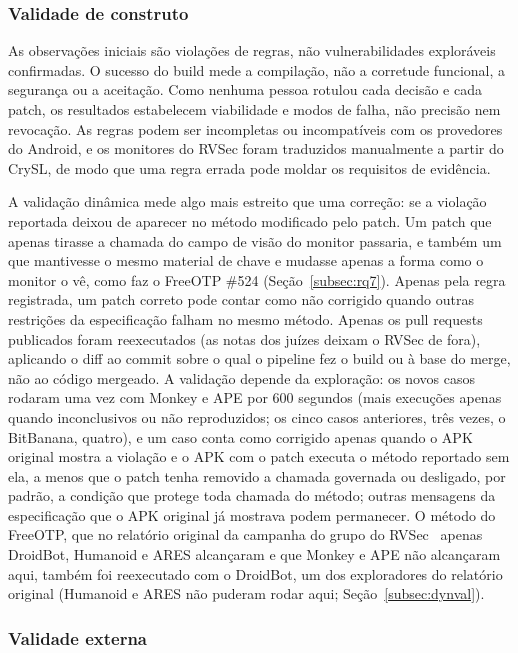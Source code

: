 \documentclass[conference]{IEEEtran}
\begin{document}
\subsubsection{Validade de construto}

As observações iniciais são violações de regras, não vulnerabilidades exploráveis
confirmadas. O sucesso do build mede a compilação, não a corretude funcional,
a segurança ou a aceitação. Como nenhuma pessoa rotulou cada decisão
e cada patch, os resultados estabelecem viabilidade e modos de falha, não precisão
nem revocação. As regras podem ser incompletas ou incompatíveis com os provedores do Android, e
os monitores do RVSec foram traduzidos manualmente a partir do CrySL, de modo que uma regra errada pode moldar
os requisitos de evidência.

A validação dinâmica mede algo mais estreito que uma correção: se a
violação reportada deixou de aparecer no método modificado pelo patch. Um patch que apenas
tirasse a chamada do campo de visão do monitor passaria, e também um que
mantivesse o mesmo material de chave e mudasse apenas a forma como o monitor o vê,
como faz o FreeOTP \#524 (Seção~\ref{subsec:rq7}). Apenas pela regra registrada, um patch correto pode contar como não corrigido
quando outras restrições da especificação falham no mesmo método. Apenas os pull requests publicados foram reexecutados (as notas dos juízes
deixam o RVSec de fora), aplicando o diff ao commit sobre o qual o pipeline fez o build ou à
base do merge, não ao código mergeado. A validação depende da exploração: os novos
casos rodaram uma vez com Monkey e APE por 600 segundos (mais execuções apenas quando
inconclusivos ou não reproduzidos; os cinco casos anteriores, três vezes, o BitBanana,
quatro), e um caso conta como corrigido apenas quando o APK original mostra a violação
e o APK com o patch executa o método reportado sem ela, a menos que o patch tenha
removido a chamada governada ou desligado, por padrão, a condição que protege toda
chamada do método; outras mensagens da especificação que o APK original já mostrava
podem permanecer.
O método do FreeOTP, que no relatório original da campanha do grupo do
RVSec~\cite{costa2026effectiveness} apenas DroidBot, Humanoid e ARES alcançaram
e que Monkey e APE não alcançaram aqui, também foi reexecutado com o DroidBot, um dos
exploradores do relatório original (Humanoid e ARES não puderam rodar aqui;
Seção~\ref{subsec:dynval}).

\subsubsection{Validade externa}
\end{document}
